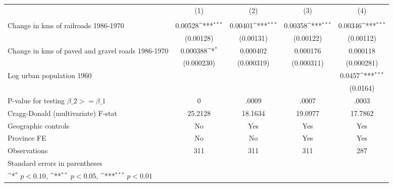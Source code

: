 {
\def\sym#1{\ifmmode^{#1}\else\(^{#1}\)\fi}
\begin{tabular}{l*{4}{c}}
\hline\hline
                &\multicolumn{1}{c}{(1)}&\multicolumn{1}{c}{(2)}&\multicolumn{1}{c}{(3)}&\multicolumn{1}{c}{(4)}\\
                &\multicolumn{1}{c}{}&\multicolumn{1}{c}{}&\multicolumn{1}{c}{}&\multicolumn{1}{c}{}\\
\hline
Change in kms of railroads 1986-1970&  0.00528\sym{***}&  0.00401\sym{***}&  0.00358\sym{***}&  0.00346\sym{***}\\
                &(0.00128)         &(0.00131)         &(0.00122)         &(0.00112)         \\
[1em]
Change in kms of paved and gravel roads 1986-1970& 0.000388\sym{*}  & 0.000402         & 0.000176         & 0.000118         \\
                &(0.000230)         &(0.000319)         &(0.000311)         &(0.000281)         \\
[1em]
Log urban population 1960&                  &                  &                  &   0.0457\sym{***}\\
                &                  &                  &                  & (0.0164)         \\
\hline
P-value for testing $\beta\_{2} >= \beta\_{1}$&        0         &    .0009         &    .0007         &    .0003         \\
Cragg-Donald (multivariate) F-stat&  25.2128         &  18.1634         &  19.0977         &  17.7862         \\
Geographic controls&       No         &      Yes         &      Yes         &      Yes         \\
Province FE     &       No         &       No         &      Yes         &      Yes         \\
Observations    &      311         &      311         &      311         &      287         \\
\hline\hline
\multicolumn{5}{l}{\footnotesize Standard errors in parentheses}\\
\multicolumn{5}{l}{\footnotesize \sym{*} \(p<0.10\), \sym{**} \(p<0.05\), \sym{***} \(p<0.01\)}\\
\end{tabular}
}
